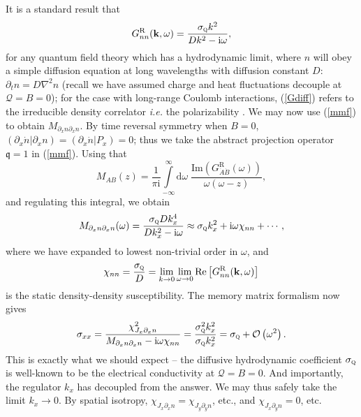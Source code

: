 \documentclass[10pt, oneside]{book}
\begin{document}
\begin{doublespace}
It is a standard result that \cite{Kadanoff1963419} \begin{equation}
G^{\mathrm{R}}_{nn}(\mathbf{k},\omega) = \frac{\sigma_{\textsc{q}}k^2}{Dk^2-\mathrm{i}\omega}, \label{Gdiff}
\end{equation}for any quantum field theory which has a hydrodynamic limit, where $n$ will obey a simple diffusion equation at long wavelengths with diffusion constant $D$: $\partial_t n = D\nabla^2 n$ (recall we have assumed charge and heat fluctuations decouple at $\mathcal{Q}=B=0$);
for the case with long-range Coulomb interactions, (\ref{Gdiff}) refers to the irreducible density correlator {\em i.e.\/} the polarizability \cite{pines,godby}.  
We may now use (\ref{mmf}) to obtain $M_{\partial_x n \partial_x n}$.   By time reversal symmetry when $B=0$, $(\partial_x \dot{n}|\partial_x n) = (\partial_x \dot{n}|P_x) = 0$;  thus we take the abstract projection operator $\mathfrak{q}=1$ in (\ref{mmf}).   Using that \cite{forster1995}\begin{equation}
M_{AB}(z) = \frac{1}{\pi \mathrm{i}}\int\limits_{-\infty}^\infty \mathrm{d}\omega \; \frac{\mathrm{Im}\left(G^{\mathrm{R}}_{\dot{A}\dot{B}}(\omega)\right)}{\omega (\omega-z)},
\end{equation}
and regulating this integral,  we obtain \begin{equation}
M_{\partial_x n \partial_x n}(\omega) = \frac{\sigma_{\textsc{q}}Dk_x^4}{Dk_x^2-\mathrm{i}\omega} \approx \sigma_{\textsc{q}}k_x^2 + \mathrm{i}\omega \chi_{nn} + \cdots,
\end{equation}where we have expanded to lowest non-trivial order in $\omega$, and \begin{equation}
\chi_{nn} = \frac{\sigma_{\textsc{q}}}{D} =  \lim_{k\rightarrow 0} \lim_{\omega\rightarrow 0} \mathrm{Re}\left[G^{\mathrm{R}}_{nn}(\mathbf{k},\omega)\right]
\end{equation}is the static density-density susceptibility.  The memory matrix formalism now gives \begin{equation}
\sigma_{xx} = \frac{\chi^2_{J_x \partial_x n}}{M_{\partial_x n \partial_x n} - \mathrm{i}\omega \chi_{nn}} = \frac{\sigma_{\textsc{q}}^2k_x^2}{\sigma_{\textsc{q}}k_x^2} = \sigma_{\textsc{q}} + \mathcal{O}\left(\omega^2\right).
\end{equation}
This is exactly what we should expect -- the diffusive hydrodynamic coefficient $\sigma_{\textsc{q}}$ is well-known to be the electrical conductivity at $\mathcal{Q}=B=0$.   And importantly, the regulator $k_x$ has decoupled from the answer.   We may thus safely take the limit $k_x\rightarrow 0$.   By spatial isotropy, $\chi_{J_x\partial_x n} = \chi_{J_y\partial_y n}$, etc., and $\chi_{J_x\partial_y n} = 0$, etc.


\end{doublespace}
\end{document}
